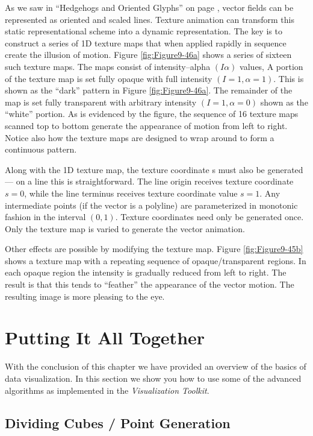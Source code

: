 As we saw in ``Hedgehogs and Oriented Glyphs'' on page \pageref{subsec:hedgehogs_oriented_glyphs}, vector fields can be represented as oriented and scaled lines. Texture animation can transform this static representational scheme into a dynamic representation. The key is to construct a series of 1D texture maps that when applied rapidly in sequence create the illusion of motion. Figure \ref{fig:Figure9-46a} shows a series of sixteen such texture maps. The maps consist of intensity--alpha $(I \alpha )$ values, A portion of the texture map is set fully opaque with full intensity $(I = 1, \alpha  = 1 )$. This is shown as the ``dark'' pattern in Figure \ref{fig:Figure9-46a}. The remainder of the map is set fully transparent with arbitrary intensity $( I = 1, \alpha = 0 )$ shown as the ``white'' portion. As is evidenced by the figure, the sequence of 16 texture maps scanned top to bottom generate the appearance of motion from left to right. Notice also how the texture maps are designed to wrap around to form a continuous pattern.

Along with the 1D texture map, the texture coordinate s must also be generated --- on a line this is straightforward. The line origin receives texture coordinate $s = 0$, while the line terminus receives texture coordinate value $s = 1$. Any intermediate points (if the vector is a polyline) are parameterized in monotonic fashion in the interval $(0,1)$. Texture coordinates need only be generated once. Only the texture map is varied to generate the vector animation.

Other effects are possible by modifying the texture map. Figure \ref{fig:Figure9-45b} shows a texture map with a repeating sequence of opaque/transparent regions. In each opaque region the intensity is gradually reduced from left to right. The result is that this tends to ``feather'' the appearance of the vector motion. The resulting image is more pleasing to the eye.

\section{Putting It All Together}

With the conclusion of this chapter we have provided an overview of the basics of data visualization. In this section we show you how to use some of the advanced algorithms as implemented in the \emph{Visualization Toolkit}.

\subsection{Dividing Cubes / Point Generation}


